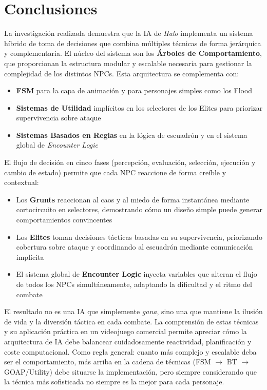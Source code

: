 \documentclass[12pt,letterpaper]{article}
\begin{document}
\section{Conclusiones}

La investigación realizada demuestra que la IA de \textit{Halo} implementa un sistema híbrido de toma de decisiones que combina múltiples técnicas de forma jerárquica y complementaria. El núcleo del sistema son los \textbf{Árboles de Comportamiento}, que proporcionan la estructura modular y escalable necesaria para gestionar la complejidad de los distintos NPCs. Esta arquitectura se complementa con:

\begin{itemize}[nosep]
  \item \textbf{FSM} para la capa de animación y para personajes simples como los Flood
  \item \textbf{Sistemas de Utilidad} implícitos en los selectores de los Elites para priorizar supervivencia sobre ataque
  \item \textbf{Sistemas Basados en Reglas} en la lógica de escuadrón y en el sistema global de \textit{Encounter Logic}
\end{itemize}

El flujo de decisión en cinco fases (percepción, evaluación, selección, ejecución y cambio de estado) permite que cada NPC reaccione de forma creíble y contextual:

\begin{itemize}[nosep]
  \item Los \textbf{Grunts} reaccionan al caos y al miedo de forma instantánea mediante cortocircuito en selectores, demostrando cómo un diseño simple puede generar comportamientos convincentes
  \item Los \textbf{Elites} toman decisiones tácticas basadas en su supervivencia, priorizando cobertura sobre ataque y coordinando al escuadrón mediante comunicación implícita
  \item El sistema global de \textbf{Encounter Logic} inyecta variables que alteran el flujo de todos los NPCs simultáneamente, adaptando la dificultad y el ritmo del combate
\end{itemize}

El resultado no es una IA que simplemente \textit{gana}, sino una que mantiene la ilusión de vida y la diversión táctica en cada combate. La comprensión de estas técnicas y su aplicación práctica en un videojuego comercial permite apreciar cómo la arquitectura de IA debe balancear cuidadosamente reactividad, planificación y coste computacional. Como regla general: cuanto más complejo y escalable deba ser el comportamiento, más arriba en la cadena de técnicas (FSM $\to$ BT $\to$ GOAP/Utility) debe situarse la implementación, pero siempre considerando que la técnica más sofisticada no siempre es la mejor para cada personaje.
\end{document}
